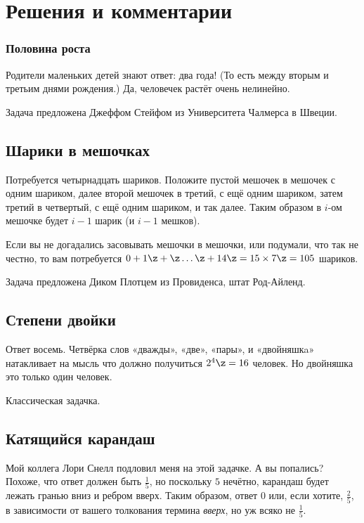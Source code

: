 \section*{Решения и комментарии}

\subsubsection*{Половина роста}

Родители маленьких детей знают ответ: два года!
(То есть между вторым и третьим днями рождения.)
Да, человечек растёт очень нелинейно.

Задача предложена Джеффом Стейфом из Университета Чалмерса в Швеции.

\subsection*{Шарики в мешочках}

Потребуется четырнадцать шариков.
Положите пустой мешочек в мешочек с одним шариком, 
далее второй мешочек в третий, с ещё одним шариком, затем третий в четвертый, с ещё одним шариком, и так далее.
Таким образом в $i$-ом мешочке будет $i-1$ шарик (и $i-1$ мешков).

Если вы не догадались засовывать мешочки в мешочки, или подумали, что так не честно, то вам потребуется $0 + 1 \z+ \z\dots \z+ 14 \z= 15 \times 7 \z= 105$ шариков.

Задача предложена Диком Плотцем из Провиденса, штат Род-Айленд.

\subsection*{Степени двойки}

Ответ восемь.
Четвёрка слов «дважды», «две», «пары», и «двойняшкa» натакливает на мысль что должно получиться $2^4 \z= 16$ человек.
Но двойняшка это только один человек.

Классическая задачка.

\subsection*{Катящийся карандаш}

Мой коллега Лори Снелл подловил меня на этой задачке.
А вы попались?
Похоже, что ответ должен быть $\tfrac15$, но поскольку $5$ нечётно, карандаш будет лежать гранью вниз и ребром вверх.
Таким образом, ответ $0$ или, если хотите, $\tfrac25$, в зависимости от вашего толкования термина \emph{вверх}, но уж всяко не $\tfrac15$.

